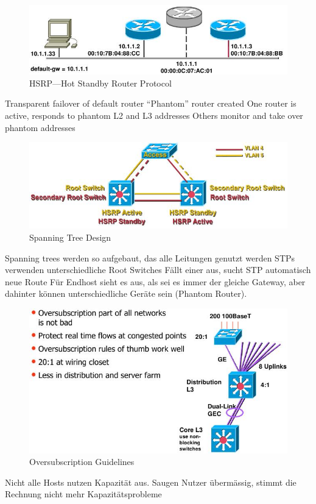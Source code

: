 \documentclass[ngerman,a4paper,12pt]{scrreprt}
\begin{document}
\begin{figure}[H]
	\centering
	 \includegraphics[width=\textwidth]{img/V5.15.jpg}
	\caption{HSRP—Hot Standby Router Protocol}
	\label{}
\end{figure}
\ul
	\li  Transparent failover of default router
 	\li “Phantom” router created
 	\li One router is active, responds to phantom L2 and L3 addresses
 	\li Others monitor and take over phantom addresses
\ulE
\begin{figure}[H]
	\centering
	 \includegraphics[width=\textwidth]{img/V5.16.jpg}
	\caption{Spanning Tree Design}
	\label{}
\end{figure}
\ul
	\li Spanning trees werden so aufgebaut, das alle Leitungen genutzt werden
	\li STPs verwenden unterschiedliche Root Switches
	\li Fällt einer aus, sucht STP automatisch neue Route
	\li Für Endhost sieht es aus, als sei es immer der gleiche Gateway, aber dahinter können unterschiedliche Geräte sein (Phantom Router).
\ulE

\begin{figure}[H]
	\centering
	 \includegraphics[width=\textwidth]{img/V5.17.jpg}
	\caption{Oversubscription Guidelines}
	\label{}
\end{figure}
\ul
	\li Nicht alle Hosts nutzen Kapazität aus. 
	\li Saugen Nutzer übermässig, stimmt die Rechnung nicht mehr \ra Kapazitätsprobleme
\ulE
\end{document}

